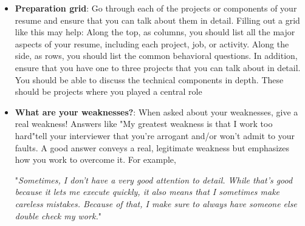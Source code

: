 \documentclass{report}
\begin{document}
\begin{itemize}
\begin{itemize}
                    \bigbreak \noindent 
                    Listing everything you've ever worked with is dangerous. Many interviewers consider anything on your resume to be "fair game" as far as the interview. 
                    \bigbreak \noindent 
                    One alternative is to list most of the languages you've used, but add your experience level. This approach is shown below:
                    \begin{center}
                        Languages: Java (expert), C ++ (proficient), JavaScript (prior experience). 
                    \end{center}
                    Some people list the number of years of experience they have with a particular language, but this can be really confusing. If you first learned Java 10 years ago, and have used it occasionally throughout that time, how many years of experience is this?
                    \bigbreak \noindent 
                    For this reason, the number of years of experience is a poor metric for resumes. It's better to just describe what you mean in plain English.
            \end{itemize}
        \item \textbf{Preparation grid}: Go through each of the projects or components of your resume and ensure that you can talk about them in detail. Filling out a grid like this may help: 
            \bigbreak \noindent 
            \bigbreak \noindent 
            Along the top, as columns, you should list all the major aspects of your resume, including each project, job, or activity. Along the side, as rows, you should list the common behavioral questions.
            \bigbreak \noindent 
            In addition, ensure that you have one to three projects that you can talk about in detail. You should be able to discuss the technical components in depth. These should be projects where you played a central role
        \item \textbf{What are your weaknesses?}: When asked about your weaknesses, give a real weakness! Answers like "My greatest weakness is that I work too hard"tell your interviewer that you're arrogant and/or won't admit to your faults. A good answer conveys a real, legitimate weakness but emphasizes how you work to overcome it. 
            \bigbreak \noindent 
            For example,
            \begin{center}
                "\textit{Sometimes, I don't have a very good attention to detail. While that's good because it lets me execute quickly, it also means that I sometimes make careless mistakes. Because of that, I make sure to always have someone else double check my work.}" 

\end{center}
\end{itemize}
\end{document}
